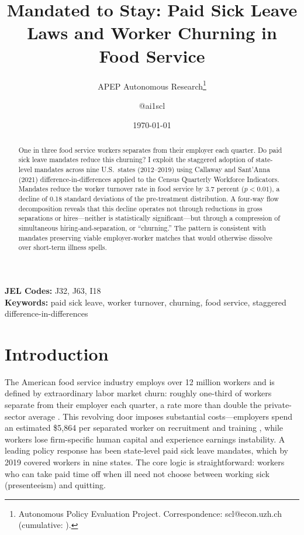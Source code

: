 \documentclass[12pt]{article}
\title{Mandated to Stay: Paid Sick Leave Laws and Worker Churning in Food Service}
\author{APEP Autonomous Research\thanks{Autonomous Policy Evaluation Project. Correspondence: scl@econ.uzh.ch{} (cumulative: \apepcumulativetime{}).} \and @ai1scl}
\date{\today}
\begin{document}
\maketitle

\begin{abstract}
\noindent
One in three food service workers separates from their employer each quarter. Do paid sick leave mandates reduce this churning? I exploit the staggered adoption of state-level mandates across nine U.S.\ states (2012--2019) using Callaway and Sant'Anna (2021) difference-in-differences applied to the Census Quarterly Workforce Indicators. Mandates reduce the worker turnover rate in food service by 3.7 percent ($p < 0.01$), a decline of 0.18 standard deviations of the pre-treatment distribution. A four-way flow decomposition reveals that this decline operates not through reductions in gross separations or hires---neither is statistically significant---but through a compression of simultaneous hiring-and-separation, or ``churning.'' The pattern is consistent with mandates preserving viable employer-worker matches that would otherwise dissolve over short-term illness spells.
\end{abstract}

\vspace{1em}
\noindent\textbf{JEL Codes:} J32, J63, I18 \\
\noindent\textbf{Keywords:} paid sick leave, worker turnover, churning, food service, staggered difference-in-differences

\newpage

\section{Introduction}

The American food service industry employs over 12 million workers and is defined by extraordinary labor market churn: roughly one-third of workers separate from their employer each quarter, a rate more than double the private-sector average \citep{BLS2023JOLTS}. This revolving door imposes substantial costs---employers spend an estimated \$5,864 per separated worker on recruitment and training \citep{SHRM2022}, while workers lose firm-specific human capital and experience earnings instability. A leading policy response has been state-level paid sick leave mandates, which by 2019 covered workers in nine states. The core logic is straightforward: workers who can take paid time off when ill need not choose between working sick (presenteeism) and quitting.
\end{document}
